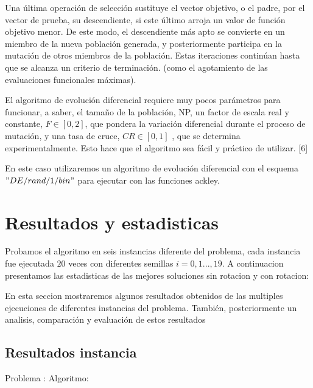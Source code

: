 \documentclass[10pt]{article}
\begin{document}
Una última operación de selección sustituye el vector objetivo, o el padre, por el vector de prueba, su descendiente, si este último arroja un valor de función objetivo menor. De este modo, el descendiente más apto se convierte en un miembro de la nueva población generada, y posteriormente participa en la mutación de otros miembros de la población. Estas iteraciones continúan hasta que se alcanza un criterio de terminación. (como el agotamiento de las evaluaciones funcionales máximas).

El algoritmo de evolución diferencial requiere muy pocos parámetros para funcionar, a saber, el tamaño de la población, NP, un factor de escala real y constante, $F \in [0, 2] $, que pondera la variación diferencial durante el proceso de mutación, y una tasa de cruce, $ CR \in  [0, 1]$ , que se determina experimentalmente. Esto hace que el algoritmo sea fácil y práctico de utilizar. [6]

En este caso utilizaremos un algoritmo de evolución diferencial con el esquema $ " DE/rand/1/bin " $ para ejecutar con las funciones ackley.


\section{Resultados y estadisticas} %
 
Probamos el algoritmo en seis instancias diferente del problema, cada instancia fue ejecutada $20$ veces con diferentes semillas $i=0,1...,19$. A continuacion presentamos las estadisticas de las mejores soluciones sin rotacion y con rotacion:

\label{sec:Estadisticas}%

En esta seccion mostraremos algunos resultados obtenidos de las multiples ejecuciones de diferentes instancias del problema.%
También, posteriormente un analisis, comparación y evaluación de estos resultados%
\subsection{Resultados instancia}%

\label{subsec:}%

Problema :  \newline%
%
 Algoritmo: %

\end{document}
